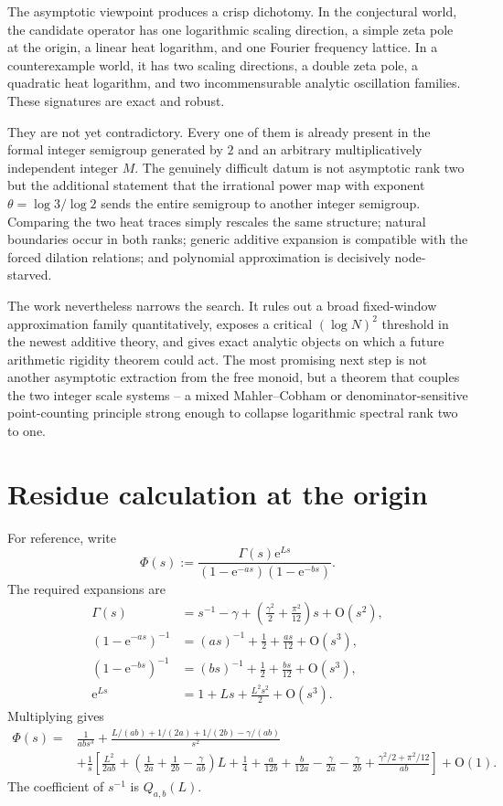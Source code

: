 \documentclass[11pt,oneside]{article}
\theoremstyle{definition}
\theoremstyle{remark}
\newcommand{\e}{\mathrm e}
\newcommand{\bigO}{\mathrm O}
\begin{document}
The asymptotic viewpoint produces a crisp dichotomy.  In the conjectural world, the candidate operator has one logarithmic scaling direction, a simple zeta pole at the origin, a linear heat logarithm, and one Fourier frequency lattice.  In a counterexample world, it has two scaling directions, a double zeta pole, a quadratic heat logarithm, and two incommensurable analytic oscillation families.  These signatures are exact and robust.

They are not yet contradictory.  Every one of them is already present in the formal integer semigroup generated by $2$ and an arbitrary multiplicatively independent integer $M$.  The genuinely difficult datum is not asymptotic rank two but the additional statement that the irrational power map with exponent $\theta=\log3/\log2$ sends the entire semigroup to another integer semigroup.  Comparing the two heat traces simply rescales the same structure; natural boundaries occur in both ranks; generic additive expansion is compatible with the forced dilation relations; and polynomial approximation is decisively node-starved.

The work nevertheless narrows the search.  It rules out a broad fixed-window approximation family quantitatively, exposes a critical $(\log N)^2$ threshold in the newest additive theory, and gives exact analytic objects on which a future arithmetic rigidity theorem could act.  The most promising next step is not another asymptotic extraction from the free monoid, but a theorem that couples the two integer scale systems -- a mixed Mahler--Cobham or denominator-sensitive point-counting principle strong enough to collapse logarithmic spectral rank two to one.

\appendix

\section{Residue calculation at the origin}
\label{app:residue}

For reference, write
\[
 \Phi(s):=\frac{\Gamma(s)\e^{Ls}}
 {(1-\e^{-as})(1-\e^{-bs})}.
\]
The required expansions are
\begin{align*}
 \Gamma(s)
 &=s^{-1}-\gamma
  +\left(\frac{\gamma^2}{2}+\frac{\pi^2}{12}\right)s+\bigO(s^2),\\
 (1-\e^{-as})^{-1}
 &=(as)^{-1}+\frac12+\frac{as}{12}+\bigO(s^3),\\
 (1-\e^{-bs})^{-1}
 &=(bs)^{-1}+\frac12+\frac{bs}{12}+\bigO(s^3),\\
 \e^{Ls}&=1+Ls+\frac{L^2s^2}{2}+\bigO(s^3).
\end{align*}
Multiplying gives
\begin{align*}
 \Phi(s)
 ={}&\frac1{ab s^3}
 +\frac{L/(ab)+1/(2a)+1/(2b)-\gamma/(ab)}{s^2}\\
 &+\frac1s\left[
 \frac{L^2}{2ab}
 +\left(\frac1{2a}+\frac1{2b}-\frac\gamma{ab}\right)L
 +\frac14+\frac a{12b}+\frac b{12a}
 -\frac\gamma{2a}-\frac\gamma{2b}
 +\frac{\gamma^2/2+\pi^2/12}{ab}
 \right]+\bigO(1).
\end{align*}
The coefficient of $s^{-1}$ is $Q_{a,b}(L)$.
\end{document}
